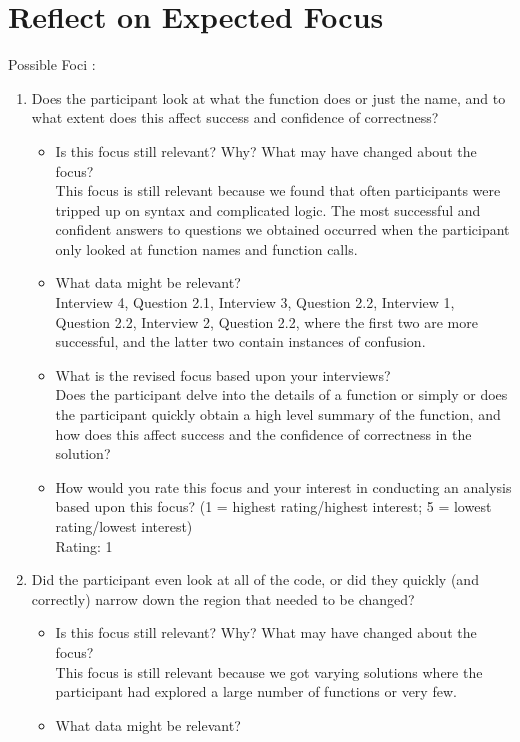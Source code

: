 \documentclass{article}
\begin{document}
\section{Reflect on Expected Focus}
Possible Foci :
\begin{enumerate}
\item Does the participant look at what the function does or just the name, and to what extent does this affect success and confidence of correctness? 
\begin{itemize}
\item Is this focus still relevant? Why? What may have changed about the focus? \\
This focus is still relevant because we found that often participants were tripped up on syntax and complicated logic. The most successful and confident answers to questions we obtained occurred when the participant only looked at function names and function calls.
\item What data might be relevant? \\
 Interview 4, Question 2.1, Interview 3, Question 2.2, Interview 1, Question 2.2, Interview 2, Question 2.2, where the first two are more successful, and the latter two contain instances of confusion. 
\item What is the revised focus based upon your interviews? \\
Does the participant delve into the details of a function or simply or does the participant quickly obtain a high level summary of the function, and how does this affect success and the confidence of correctness in the solution?
\item How would you rate this focus and your interest in conducting an analysis based upon this focus? (1 = highest rating/highest interest; 5 = lowest rating/lowest interest) \\
Rating: 1
  \end{itemize}
\item Did the participant even look at all of the code, or did they quickly (and correctly) narrow down the region that needed to be changed?
  \begin{itemize}
\item Is this focus still relevant? Why? What may have changed about the focus? \\
This focus is still relevant because we got varying solutions where the participant had explored a large number of functions or very few. 
\item What data might be relevant? \\

\end{itemize}
\end{enumerate}
\end{document}
